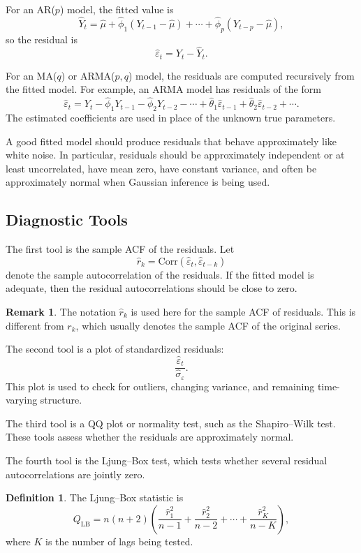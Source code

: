 \documentclass[12pt,oneside]{book}
\numberwithin{equation}{section}
\theoremstyle{definition}
\newtheorem{definition}{Definition}[section]
\newtheorem{remark}{Remark}[section]
\theoremstyle{plain}
\theoremstyle{remark}
\newcommand{\Corr}{\mathrm{Corr}}
\begin{document}
For an AR($p$) model, the fitted value is
\[
\widehat{Y}_t
=
\widehat{\mu}
+
\widehat{\phi}_1(Y_{t-1}-\widehat{\mu})
+\cdots+
\widehat{\phi}_p(Y_{t-p}-\widehat{\mu}),
\]
so the residual is
\[
\widehat{\varepsilon}_t
=
Y_t-\widehat{Y}_t.
\]

For an MA($q$) or ARMA($p,q$) model, the residuals are computed recursively from the fitted model. For example, an ARMA model has residuals of the form
\[
\widehat{\varepsilon}_t
=
Y_t
-
\widehat{\phi}_1Y_{t-1}
-\widehat{\phi}_2Y_{t-2}
-\cdots
+
\widehat{\theta}_1\widehat{\varepsilon}_{t-1}
+
\widehat{\theta}_2\widehat{\varepsilon}_{t-2}
+\cdots.
\]
The estimated coefficients are used in place of the unknown true parameters.

A good fitted model should produce residuals that behave approximately like white noise. In particular, residuals should be approximately independent or at least uncorrelated, have mean zero, have constant variance, and often be approximately normal when Gaussian inference is being used.

\subsection{Diagnostic Tools}

The first tool is the sample ACF of the residuals. Let
\[
\widehat{r}_k
=
\Corr(\widehat{\varepsilon}_t,\widehat{\varepsilon}_{t-k})
\]
denote the sample autocorrelation of the residuals. If the fitted model is adequate, then the residual autocorrelations should be close to zero.

\begin{remark}
The notation $\widehat{r}_k$ is used here for the sample ACF of residuals. This is different from $r_k$, which usually denotes the sample ACF of the original series.
\end{remark}

The second tool is a plot of standardized residuals:
\[
\frac{\widehat{\varepsilon}_t}{\widehat{\sigma}_\varepsilon}.
\]
This plot is used to check for outliers, changing variance, and remaining time-varying structure.

The third tool is a QQ plot or normality test, such as the Shapiro--Wilk test. These tools assess whether the residuals are approximately normal.

The fourth tool is the Ljung--Box test, which tests whether several residual autocorrelations are jointly zero.

\begin{definition}
The Ljung--Box statistic is
\[
Q_{\mathrm{LB}}
=
n(n+2)
\left(
\frac{\widehat{r}_1^2}{n-1}
+
\frac{\widehat{r}_2^2}{n-2}
+
\cdots+
\frac{\widehat{r}_K^2}{n-K}
\right),
\]
where $K$ is the number of lags being tested.
\end{definition}
\end{document}
